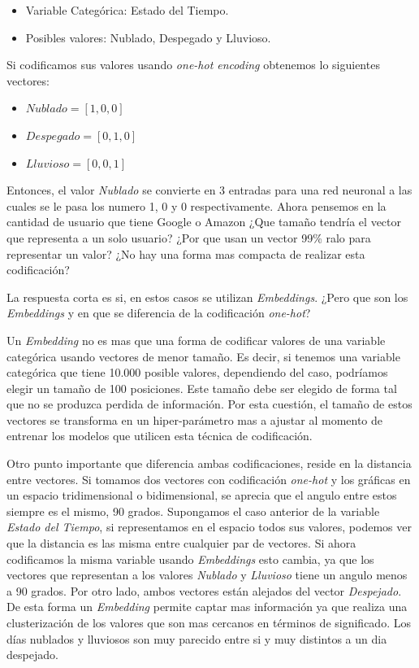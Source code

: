 \documentclass[11pt,a4paper,twoside]{thesis}
\begin{document}
\begin{itemize}
	\item Variable Categórica: Estado del Tiempo.
	\item Posibles valores: Nublado, Despegado y Lluvioso.
\end{itemize}


Si codificamos sus valores usando \textit{one-hot encoding} obtenemos lo siguientes vectores:

\begin{itemize}
	\item $Nublado    = [1, 0, 0]$
	\item $Despegado  = [0, 1, 0]$
	\item $Lluvioso   = [0, 0, 1]$
\end{itemize}

Entonces, el valor \textit{Nublado} se convierte en 3 entradas para una red neuronal a las cuales se le pasa los numero 1, 0 y 0 respectivamente. Ahora pensemos en la cantidad de usuario que tiene Google o Amazon ¿Que tamaño tendría el vector que representa a un solo usuario? ¿Por que usan un vector 99\% ralo para representar un valor? ¿No hay una forma mas compacta de realizar esta codificación? 

La respuesta corta es si, en estos casos se utilizan \textit{Embeddings}. ¿Pero que son los \textit{Embeddings} y en que se diferencia de la codificación \textit{one-hot}?

Un \textit{Embedding} no es mas que una forma de codificar valores de una variable categórica usando vectores de menor tamaño. Es decir, si tenemos una variable categórica
que tiene 10.000 posible valores, dependiendo del caso, podríamos elegir un tamaño de 100 posiciones. Este tamaño debe ser elegido de forma tal que no se produzca
perdida de información. Por esta cuestión, el tamaño de estos vectores se transforma en un hiper-parámetro mas a ajustar al momento de entrenar los modelos que utilicen esta técnica de codificación.

Otro punto importante que diferencia ambas codificaciones, reside en la distancia entre vectores. Si tomamos dos vectores con codificación \textit{one-hot} y los gráficas en un espacio tridimensional o bidimensional, se aprecia que el angulo entre estos siempre es el mismo, 90 grados. Supongamos el caso anterior de la variable \textit{Estado del Tiempo}, si representamos en el espacio todos sus valores, podemos ver que la distancia es las misma entre cualquier par de vectores.
Si ahora codificamos la misma variable usando \textit{Embeddings} esto cambia, ya que los vectores que representan a los valores \textit{Nublado} y \textit{Lluvioso} tiene un angulo menos a 90 grados. Por otro lado, ambos vectores están alejados del vector \textit{Despejado}. De esta forma un \textit{Embedding} permite captar mas información ya que realiza una clusterización de los valores que son mas cercanos en términos de significado. Los días nublados y lluviosos son muy parecido entre si y muy distintos a un dia despejado.
\end{document}
